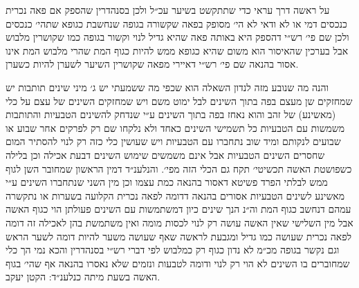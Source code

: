 \documentclass[12pt, openany]{book}
\begin{document}
\begin{multicols}{2}
על ראשה דרך עראי כדי שתתקשט בשיער עכ״ל ולכן בסנהדרין שהספק אם פאה נכרית כנכסים דמי או לא ודאי לא הי׳ מסופק בפאה שקשורה בגופה שנחשבת כגופא שתהי׳ כנכסים ולכן שם פי׳ רש״י דהספק היא באותה פאה שהיא גדיל לנוי וקשור בגופה כמו שקושרין מלבוש אבל בערכין שהאיסור הוא משום שהיא כגופא ממש להיות כגוף המת שהרי מלבוש המת אינו אסור בהנאה שם פי׳ רש״י דאיירי מפאה שקושרין השיער לשערן להיות כשערן.\\\vspace{0pt}

והנה מה שנובע מזה לנדון השאלה הוא שכפי מה ששמעתי יש ג׳ מיני שינים תותבות יש שמחזקים שן מעצם בפה בתוך השינים לבל ימוט משם ויש שמחזקים השינים של עצם על כלי (מאשינע) של זהב והוא נאחז בפה בתוך השינים ע״י שנדחק להשינים הטבעיות והתותבות משמשות עם הטבעיות כל תשמישי השינים כאחד ולא נלקחו שם רק לפרקים אחר שבוע או שבועים לנקותם ומיד שוב נתחברו עם הטבעיות ויש שעושין כלי כזה רק לנוי להסתיר המום שחסרים השינים הטבעיות אבל אינם משמשים שימוש השינים דבעת אכילה וכן בלילה כשפושטת האשה תכשיטי׳ תקח גם הכלי הזה מפי׳. והנלענ״ד דמין הראשון שמחובר השן לגוף ממש לבלתי הפרד פשיטא דאסור בהנאה כמת עצמו וכן מין השני שנתחברו השינים ע״י מאשינע לשינים הטבעיות אסורים בהנאה דדומה לפאה נכרית הקלועה בשערות או נתקשרה עמהם דנחשב כגוף המת וה״נ הנך שינים כיון דמשתמשות עם השינים פעולתן הוי כגוף האשה אבל מין השלישי שאין האשה עושה רק לנוי לכסות מומה ואין משתמשת בהן לאכילה זה דומה לפאה נכרית שעושה כמו גדיל ומגבעת לראשה שאף שעושה משער להיות דומה לשער הראש וגם נקשר בגופה מכ״מ לא נדון כגוף רק כמלבוש לפי דברי רש״י בסנהדרין והכא נמי הך כלי שמחוברים בו השינים לא הוי רק לנוי ודומה לטבעות ונזמים שלא נאסרו בהנאה אף שהי׳ בגוף האשה בשעת מיתה כנלענ״ד: הקטן יעקב.\\\vspace{0pt}

\end{multicols}\newpage
\end{document}
